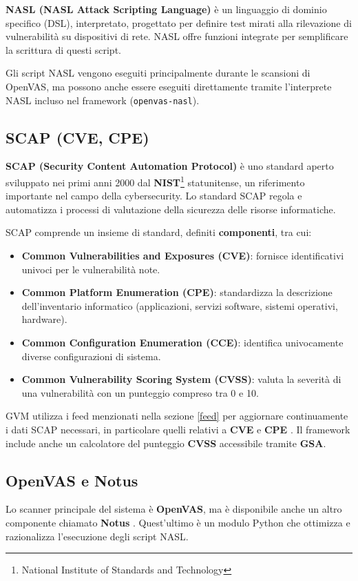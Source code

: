 \textbf{NASL (NASL Attack Scripting Language)} \`e un linguaggio di dominio specifico (DSL), interpretato, progettato per definire test mirati alla rilevazione di vulnerabilità su dispositivi di rete. NASL offre funzioni integrate per semplificare la scrittura di questi script.

Gli script NASL vengono eseguiti principalmente durante le scansioni di OpenVAS, ma possono anche essere eseguiti direttamente tramite l'interprete NASL incluso nel framework (\texttt{openvas-nasl}).

\subsection{SCAP (CVE, CPE)}
\textbf{SCAP (Security Content Automation Protocol)} è uno standard aperto sviluppato nei primi anni 2000 dal \textbf{NIST}\footnote{National Institute of Standards and Technology} statunitense, un riferimento importante nel campo della cybersecurity. Lo standard SCAP regola e automatizza i processi di valutazione della sicurezza delle risorse informatiche.

SCAP comprende un insieme di standard, definiti \textbf{componenti}, tra cui:
\begin{itemize}
    \item \textbf{Common Vulnerabilities and Exposures (CVE)}: fornisce identificativi univoci per le vulnerabilità note.
    \item \textbf{Common Platform Enumeration (CPE)}: standardizza la descrizione dell'inventario informatico (applicazioni, servizi software, sistemi operativi, hardware).
    \item \textbf{Common Configuration Enumeration (CCE)}: identifica univocamente diverse configurazioni di sistema.
    \item \textbf{Common Vulnerability Scoring System (CVSS)}: valuta la severità di una vulnerabilità con un punteggio compreso tra 0 e 10.
\end{itemize}

GVM utilizza i feed menzionati nella sezione \ref{feed} per aggiornare continuamente i dati SCAP necessari, in particolare quelli relativi a \textbf{CVE} e \textbf{CPE} \cite{greenbone-scap}. Il framework include anche un calcolatore del punteggio \textbf{CVSS} accessibile tramite \textbf{GSA}.

\subsection{OpenVAS e Notus}
\label{notus}
Lo scanner principale del sistema è \textbf{OpenVAS}, ma è disponibile anche un altro componente chiamato \textbf{Notus} \cite{notus-scanner}. Quest'ultimo è un modulo Python che ottimizza e razionalizza l'esecuzione degli script NASL.

